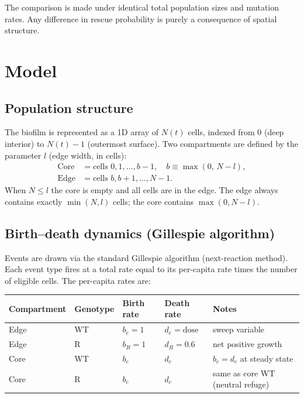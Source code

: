 \documentclass[12pt]{article}
\newcommand{\bEdge}{b_e}
\newcommand{\dEdge}{d_e}
\newcommand{\bCore}{b_c}
\newcommand{\dCore}{d_c}
\begin{document}
The comparison is made under identical total population sizes and mutation
rates. Any difference in rescue probability is purely a consequence of spatial
structure.

\section{Model}
\label{sec:model}

\subsection{Population structure}

The biofilm is represented as a 1D array of $N(t)$ cells, indexed from $0$
(deep interior) to $N(t)-1$ (outermost surface). Two compartments are defined
by the parameter $l$ (edge width, in cells):
\begin{align}
    \text{Core} &= \text{cells } 0, 1, \ldots, b-1, \quad b \equiv \max(0,\, N-l), \\
    \text{Edge} &= \text{cells } b, b+1, \ldots, N-1.
\end{align}
When $N \leq l$ the core is empty and all cells are in the edge. The edge
always contains exactly $\min(N, l)$ cells; the core contains $\max(0, N-l)$.

\subsection{Birth--death dynamics (Gillespie algorithm)}

Events are drawn via the standard Gillespie algorithm (next-reaction
method). Each event type fires at a total rate equal to its per-capita rate
times the number of eligible cells. The per-capita rates are:

\begin{center}
\begin{tabular}{lllll}
\toprule
Compartment & Genotype & Birth rate & Death rate & Notes \\
\midrule
Edge  & WT & $\bEdge = 1$ & $\dEdge = \text{dose}$ & sweep variable \\
Edge  & R  & $b_R = 1$    & $d_R = 0.6$             & net positive growth \\
Core  & WT & $\bCore$     & $\dCore$                & $\bCore = \dCore$ at steady state \\
Core  & R  & $\bCore$     & $\dCore$                & same as core WT (neutral refuge) \\
\bottomrule
\end{tabular}
\end{center}
\end{document}
